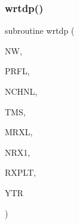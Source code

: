 \subsubsection{\texorpdfstring{wrtdp()}{wrtdp()}}
{\footnotesize\ttfamily subroutine wrtdp (\begin{DoxyParamCaption}\item[{integer}]{NW,  }\item[{integer}]{P\+R\+FL,  }\item[{integer}]{N\+C\+H\+NL,  }\item[{real, dimension(nchnl)}]{T\+MS,  }\item[{integer}]{M\+R\+XL,  }\item[{integer}]{N\+R\+X1,  }\item[{real(kind=ql), dimension(3,mrxl)}]{R\+X\+P\+LT,  }\item[{real, dimension(nchnl,mrxl)}]{Y\+TR }\end{DoxyParamCaption})}

